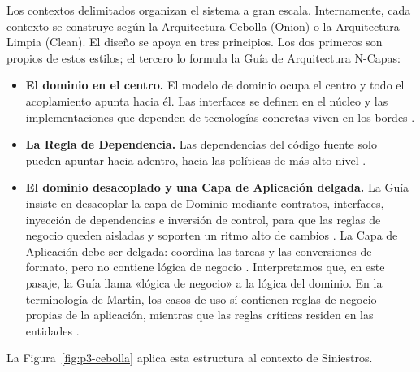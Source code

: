 Los contextos delimitados organizan el sistema a gran escala. Internamente, cada contexto
se construye según la Arquitectura Cebolla (Onion) o la Arquitectura Limpia (Clean). El
diseño se apoya en tres principios. Los dos primeros son propios de estos estilos; el
tercero lo formula la Guía de Arquitectura N-Capas:
\begin{itemize}
  \item \textbf{El dominio en el centro.} El modelo de dominio ocupa el centro y todo el
        acoplamiento apunta hacia él. Las interfaces se definen en el núcleo y las
        implementaciones que dependen de tecnologías concretas viven en los bordes
        \parencite{palermo2008}.
  \item \textbf{La Regla de Dependencia.} Las dependencias del código fuente solo pueden
        apuntar hacia adentro, hacia las políticas de más alto nivel
        \parencite[203]{martin2017}.
  \item \textbf{El dominio desacoplado y una Capa de Aplicación delgada.} La Guía insiste en desacoplar la capa de Dominio
        mediante contratos, interfaces, inyección de dependencias e inversión de control,
        para que las reglas de negocio queden aisladas y soporten un ritmo alto de cambios
        \parencite[159]{delatorre2010}. La Capa de Aplicación debe ser delgada: coordina
        las tareas y las conversiones de formato, pero no contiene lógica de negocio
        \parencite[247]{delatorre2010}. Interpretamos que, en este pasaje, la Guía llama
        «lógica de negocio» a la lógica del dominio. En la terminología de Martin, los casos de uso sí
        contienen reglas de negocio propias de la aplicación, mientras que las reglas
        críticas residen en las entidades \parencite[204]{martin2017}.
\end{itemize}

La Figura~\ref{fig:p3-cebolla} aplica esta estructura al contexto de Siniestros.

